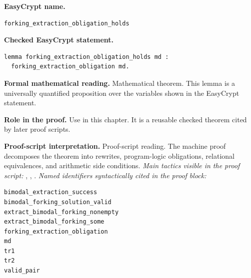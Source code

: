 \begin{formaltheorem}
\noindent\textbf{EasyCrypt name.}
\begin{lstlisting}[language=EasyCrypt,basicstyle=\ttfamily\scriptsize]
forking_extraction_obligation_holds
\end{lstlisting}
\noindent\textbf{Checked EasyCrypt statement.}
\begin{lstlisting}[language=EasyCrypt,basicstyle=\ttfamily\scriptsize]
lemma forking_extraction_obligation_holds md :
  forking_extraction_obligation md.
\end{lstlisting}
\noindent\textbf{Formal mathematical reading.}
Mathematical theorem. This lemma is a universally quantified proposition over the variables shown in the EasyCrypt statement.

\noindent\textbf{Role in the proof.}
Use in this chapter. It is a reusable checked theorem cited by later proof scripts.

\noindent\textbf{Proof-script interpretation.}
Proof-script reading. The machine proof decomposes the theorem into rewrites, program-logic obligations, relational equivalences, and arithmetic side conditions.
\emph{Main tactics visible in the proof script:} , , .
\emph{Named identifiers syntactically cited in the proof block:}
\begin{lstlisting}[language=EasyCrypt,basicstyle=\ttfamily\scriptsize]
bimodal_extraction_success
bimodal_forking_solution_valid
extract_bimodal_forking_nonempty
extract_bimodal_forking_some
forking_extraction_obligation
md
tr1
tr2
valid_pair
\end{lstlisting}

\end{formaltheorem}

